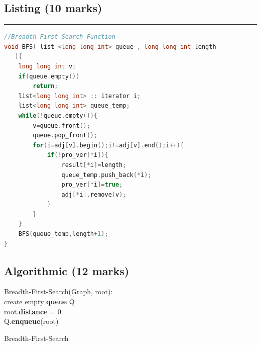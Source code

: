 \documentclass[12pt]{article}
\begin{document}
\subsection{Listing (10 marks)}
\par\noindent\rule{\textwidth}{0.4pt}
{
\begin{lstlisting}[language=C++]
//Breadth First Search Function
void BFS( list <long long int> queue , long long int length
   ){
    long long int v;
    if(queue.empty())
        return;
    list<long long int> :: iterator i;
    list<long long int> queue_temp;
    while(!queue.empty()){
        v=queue.front();
        queue.pop_front();
        for(i=adj[v].begin();i!=adj[v].end();i++){
            if(!pro_ver[*i]){
                result[*i]=length;
                queue_temp.push_back(*i);
                pro_ver[*i]=true;
                adj[*i].remove(v);
            }
        }
    }
    BFS(queue_temp,length+1);
}
\end{lstlisting}
}
\subsection{Algorithmic (12 marks)}
\begin{large}
\begin{algorithm}[H]
\SetAlgoLined
{}
 Breadth-First-Search(Graph, root): \\
 create empty \textbf{queue} Q \\
 root.\textbf{distance} = 0 \\
 Q.\textbf{enqueue}(root) \\
 \caption{Breadth-First-Search}
\end{algorithm}
\end{large}
\end{document}
